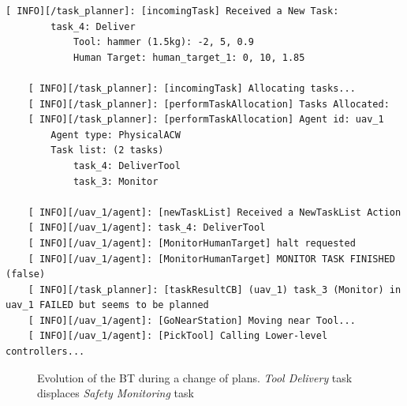 \begin{lstlisting}[caption={Feedback messages printed after a change of plans. \emph{Tool Delivery} task displaces \emph{Safety Monitoring} task}, breaklines=true, label=exit:event_ChangeOfPlans]
    [ INFO][/task_planner]: [incomingTask] Received a New Task:
        task_4: Deliver
            Tool: hammer (1.5kg): -2, 5, 0.9
            Human Target: human_target_1: 0, 10, 1.85

    [ INFO][/task_planner]: [incomingTask] Allocating tasks...
    [ INFO][/task_planner]: [performTaskAllocation] Tasks Allocated:
    [ INFO][/task_planner]: [performTaskAllocation] Agent id: uav_1
        Agent type: PhysicalACW
        Task list: (2 tasks)
            task_4: DeliverTool
            task_3: Monitor

    [ INFO][/uav_1/agent]: [newTaskList] Received a NewTaskList Action
    [ INFO][/uav_1/agent]: task_4: DeliverTool
    [ INFO][/uav_1/agent]: [MonitorHumanTarget] halt requested
    [ INFO][/uav_1/agent]: [MonitorHumanTarget] MONITOR TASK FINISHED (false)
    [ INFO][/task_planner]: [taskResultCB] (uav_1) task_3 (Monitor) in uav_1 FAILED but seems to be planned
    [ INFO][/uav_1/agent]: [GoNearStation] Moving near Tool...
    [ INFO][/uav_1/agent]: [PickTool] Calling Lower-level controllers...
\end{lstlisting}

\begin{figure}[htbp]
    \centering
    \hfill
    \hfill
    \caption{Evolution of the \gls{BT} during a change of plans. \emph{Tool Delivery} task displaces \emph{Safety Monitoring} task}
    \label{fig:event_ChangeOfPlans}
\end{figure}

